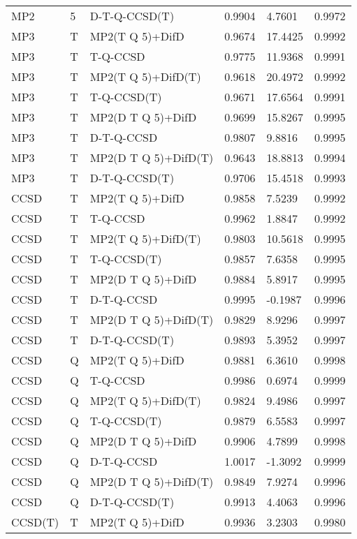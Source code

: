 \begin{table}
\begin{tabular}{l l l l l l }
    MP2 & 5 & D-T-Q-CCSD(T) & 0.9904 & 4.7601 & 0.9972 \\ 
    MP3 & T & MP2(T Q 5)+DifD & 0.9674 & 17.4425 & 0.9992 \\ 
    MP3 & T & T-Q-CCSD & 0.9775 & 11.9368 & 0.9991 \\ 
    MP3 & T & MP2(T Q 5)+DifD(T) & 0.9618 & 20.4972 & 0.9992 \\ 
    MP3 & T & T-Q-CCSD(T) & 0.9671 & 17.6564 & 0.9991 \\ 
    MP3 & T & MP2(D T Q 5)+DifD & 0.9699 & 15.8267 & 0.9995 \\ 
    MP3 & T & D-T-Q-CCSD & 0.9807 & 9.8816 & 0.9995 \\ 
    MP3 & T & MP2(D T Q 5)+DifD(T) & 0.9643 & 18.8813 & 0.9994 \\ 
    MP3 & T & D-T-Q-CCSD(T) & 0.9706 & 15.4518 & 0.9993 \\ 
    CCSD & T & MP2(T Q 5)+DifD & 0.9858 & 7.5239 & 0.9992 \\ 
    CCSD & T & T-Q-CCSD & 0.9962 & 1.8847 & 0.9992 \\ 
    CCSD & T & MP2(T Q 5)+DifD(T) & 0.9803 & 10.5618 & 0.9995 \\ 
    CCSD & T & T-Q-CCSD(T) & 0.9857 & 7.6358 & 0.9995 \\ 
    CCSD & T & MP2(D T Q 5)+DifD & 0.9884 & 5.8917 & 0.9995 \\ 
    CCSD & T & D-T-Q-CCSD & 0.9995 & -0.1987 & 0.9996 \\ 
    CCSD & T & MP2(D T Q 5)+DifD(T) & 0.9829 & 8.9296 & 0.9997 \\ 
    CCSD & T & D-T-Q-CCSD(T) & 0.9893 & 5.3952 & 0.9997 \\ 
    CCSD & Q & MP2(T Q 5)+DifD & 0.9881 & 6.3610 & 0.9998 \\ 
    CCSD & Q & T-Q-CCSD & 0.9986 & 0.6974 & 0.9999 \\ 
    CCSD & Q & MP2(T Q 5)+DifD(T) & 0.9824 & 9.4986 & 0.9997 \\ 
    CCSD & Q & T-Q-CCSD(T) & 0.9879 & 6.5583 & 0.9997 \\ 
    CCSD & Q & MP2(D T Q 5)+DifD & 0.9906 & 4.7899 & 0.9998 \\ 
    CCSD & Q & D-T-Q-CCSD & 1.0017 & -1.3092 & 0.9999 \\ 
    CCSD & Q & MP2(D T Q 5)+DifD(T) & 0.9849 & 7.9274 & 0.9996 \\ 
    CCSD & Q & D-T-Q-CCSD(T) & 0.9913 & 4.4063 & 0.9996 \\ 
    CCSD(T) & T & MP2(T Q 5)+DifD & 0.9936 & 3.2303 & 0.9980 \\ 

\end{tabular}
\end{table}
